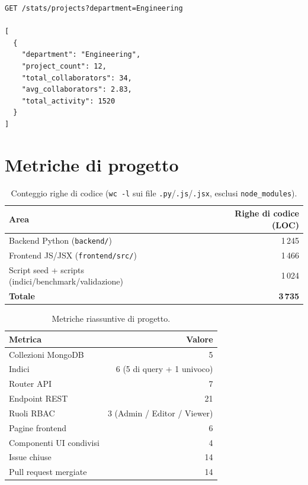 \documentclass[11pt,a4paper]{article}
\begin{document}
\begin{lstlisting}
GET /stats/projects?department=Engineering

[
  {
    "department": "Engineering",
    "project_count": 12,
    "total_collaborators": 34,
    "avg_collaborators": 2.83,
    "total_activity": 1520
  }
]
\end{lstlisting}

\pagebreak

\section{Metriche di progetto}

\begin{table}[h!]
\centering
\begin{tabular}{@{}lr@{}}
\toprule
\textbf{Area} & \textbf{Righe di codice (LOC)} \\
\midrule
Backend Python (\texttt{backend/}) & 1\,245 \\
Frontend JS/JSX (\texttt{frontend/src/}) & 1\,466 \\
Script seed + scripts (indici/benchmark/validazione) & 1\,024 \\
\midrule
\textbf{Totale} & \textbf{3\,735} \\
\bottomrule
\end{tabular}
\caption{Conteggio righe di codice (\texttt{wc -l} sui file \texttt{.py}/\texttt{.js}/\texttt{.jsx}, esclusi \texttt{node\_modules}).}
\end{table}

\begin{table}[h!]
\centering
\begin{tabular}{@{}lr@{}}
\toprule
\textbf{Metrica} & \textbf{Valore} \\
\midrule
Collezioni MongoDB & 5 \\
Indici & 6 (5 di query + 1 univoco) \\
Router API & 7 \\
Endpoint REST & 21 \\
Ruoli RBAC & 3 (Admin / Editor / Viewer) \\
Pagine frontend & 6 \\
Componenti UI condivisi & 4 \\
Issue chiuse & 14 \\
Pull request mergiate & 14 \\
\bottomrule
\end{tabular}
\caption{Metriche riassuntive di progetto.}
\end{table}
\end{document}
